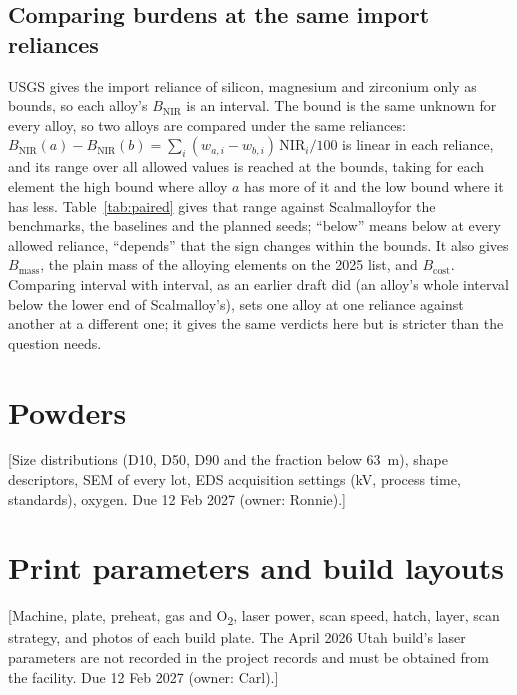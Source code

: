 \documentclass[11pt]{article}
\newcommand{\placeholder}[1]{\textcolor{red!75!black}{[#1]}}
\newcommand{\Scal}{Scalmalloy}
\begin{document}
\subsection*{Comparing burdens at the same import reliances}
USGS gives the import reliance of silicon, magnesium and zirconium only as bounds, so each alloy's $B_\mathrm{NIR}$ is an interval. The bound is the same unknown for every alloy, so two alloys are compared under the same reliances: $B_\mathrm{NIR}(a) - B_\mathrm{NIR}(b) = \sum_i (w_{a,i} - w_{b,i})\,\mathrm{NIR}_i/100$ is linear in each reliance, and its range over all allowed values is reached at the bounds, taking for each element the high bound where alloy $a$ has more of it and the low bound where it has less. Table~\ref{tab:paired} gives that range against \Scal for the benchmarks, the baselines and the planned seeds; ``below'' means below at every allowed reliance, ``depends'' that the sign changes within the bounds. It also gives $B_\mathrm{mass}$, the plain mass of the alloying elements on the 2025 list, and $B_\mathrm{cost}$. Comparing interval with interval, as an earlier draft did (an alloy's whole interval below the lower end of \Scal's), sets one alloy at one reliance against another at a different one; it gives the same verdicts here but is stricter than the question needs.

\begin{table}[htbp]
  \centering\scriptsize
  \caption{$B_\mathrm{NIR}$ against \Scal{} with both alloys under the same import reliances, nominal compositions (data/alloys.csv). The baselines' rows use their vendors' typical values or range midpoints until the outside laboratory measures their lots; With Si and Ti at zero, Al5X1's Mg--Zr--Mn range spans $B_\mathrm{NIR}$ 2.0--5.7~wt\% and stays below \Scal{} at every corner; with Si and Ti at their allowed 1.0~wt\% it reaches 7.65~wt\% and would not, so the lot's measured composition decides.}
  \label{tab:paired}
  \resizebox{\textwidth}{!}{}
\end{table}

\section{Powders}
\placeholder{Size distributions (D10, D50, D90 and the fraction below 63~\textmu m), shape descriptors, SEM of every lot, EDS acquisition settings (kV, process time, standards), oxygen. Due 12 Feb 2027 (owner: Ronnie).}

\section{Print parameters and build layouts}
\placeholder{Machine, plate, preheat, gas and O\textsubscript{2}, laser power, scan speed, hatch, layer, scan strategy, and photos of each build plate. The April 2026 Utah build's laser parameters are not recorded in the project records and must be obtained from the facility. Due 12 Feb 2027 (owner: Carl).}
\end{document}
